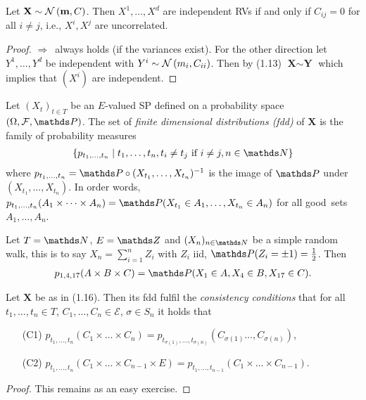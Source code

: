 \begin{prop}
Let $\textbf{X}\sim \mathcal{N}\left(\textbf{m},C\right)$.
Then $X^1,\dots,X^d$ are independent RVs if and only if $C_{ij}=0$ for all $i\not = j$, i.e., $X^i,X^j$ are uncorrelated.
\end{prop}
\begin{proof}
\glqq $\Rightarrow$\grqq\, always holds (if the variances exist).
For the other direction let $Y^1,\dots,Y^d$ be independent with $Y^i\sim \mathcal{N}\left(m_i,C_{ii}\right)$.
Then by (1.13) $\textbf{X} \sim \textbf{Y}$ which implies that $(X^i)$ are independent.
\end{proof}

\begin{defi}
Let $(X_t)_{t \in T}$ be an $E$-valued SP defined on a probability space $(\Omega,\mathcal{F},\Prob)$. The set of \emph{finite dimensional distributions (fdd)} of $\textbf{X}$ is the family of probability measures
\begin{align*}
\{p_{t_1,\dots,t_n}\mid t_1,\dots,t_n, t_i\not =t_j \text{ if } i \not = j,n\in \N\}
\end{align*}
where $p_{t_1,\dots,t_n}=\Prob \circ (X_{t_1},\dots,X_{t_n})^{-1}$ is the image of $\Prob$ under $(X_{t_1},\dots,X_{t_n})$.
In order words, $p_{t_1,\dots,t_n}(A_1\times \dots \times A_n)=\Prob(X_{t_1}\in A_1,\dots,X_{t_n}\in A_n)$ for all \glqq good\grqq\, sets $A_1,\dots,A_n$.
\end{defi}

\begin{bsp}
Let $T=\N$, $E=\Z$ and $(X_n)_{n\in \N}$ be a simple random walk, this is to say
$X_n=\sum_{i=1}^n Z_i$ with $Z_i$ iid, $\Prob(Z_i=\pm 1)=\frac{1}{2}$.
Then
\begin{align*}
p_{1,4,17}(A\times B\times C)=\Prob(X_1\in A,X_4\in B,X_{17}\in C).
\qedhere
\end{align*}
\end{bsp}

\begin{prop}
Let $\textbf{X}$ be as in (1.16). Then its fdd fulfil the \emph{consistency conditions} that for all $t_1,\dots,t_n \in T$, $C_1,\dots,C_n \in \mathcal{E}$, $\sigma\in S_n$ it holds that
\begin{enumerate}
\item[(C1)] $p_{t_1,\dots ,t_n}(C_1\times \dots \times C_n)=p_{t_{\sigma(1)},\dots ,t_{\sigma(n)}}(C_{\sigma(1)}\dots ,C_{\sigma(n)})$,
\item[(C2)] $p_{t_1,\dots , t_n}(C_1\times \dots \times C_{n-1}\times E)=p_{t_1,\dots ,t_{n-1}}(C_1\times \dots \times C_{n-1})$.
\qedhere
\end{enumerate}
\end{prop}
\begin{proof}
This remains as an easy exercise.
\end{proof}

